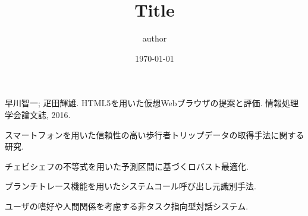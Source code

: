 \documentclass[dvipdfmx,8pt]{beamer}
\title{Title}
\author{author}
\institute{Kaori Lab., Kyushu Institute of Technology}
\date{\today}
\begin{document}
\frame[plain]{
  \titlepage
}
\addtocounter{framenumber}{-1}
\begin{frame}
  {早川智一; 疋田輝雄. HTML5を用いた仮想Webブラウザの提案と評価. 情報処理学会論文誌, 2016. \cite{weko_148195_1}}

  {スマートフォンを用いた信頼性の高い歩行者トリップデータの取得手法に関する研究. \cite{2016d}}

  {チェビシェフの不等式を用いた予測区間に基づくロバスト最適化. \cite{weko_157917_1}}

  {ブランチトレース機能を用いたシステムコール呼び出し元識別手法. \cite{weko_148217_1}}

  {ユーザの嗜好や人間関係を考慮する非タスク指向型対話システム. \cite{2016g}}

	
\end{frame}

\end{document}
